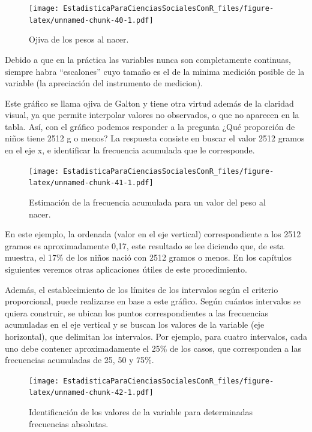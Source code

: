 \documentclass[]{book}
\begin{document}
\begin{figure}
\centering
\texttt{[image: EstadisticaParaCienciasSocialesConR\_files/figure-latex/unnamed-chunk-40-1.pdf]}
\caption{\label{fig:unnamed-chunk-40}Ojiva de los pesos al nacer.}
\end{figure}

Debido a que en la práctica las variables nunca son completamente continuas, siempre habra ``escalones'' cuyo tamaño es el de la minima medición posible de la variable (la apreciación del instrumento de medicion).

Este gráfico se llama ojiva de Galton y tiene otra virtud además de la claridad visual, ya que permite interpolar valores no observados, o que no aparecen en la tabla. Así, con el gráfico podemos responder a la pregunta ¿Qué proporción de niños tiene 2512 g o menos? La respuesta consiste en buscar el valor 2512 gramos en el eje x, e identificar la frecuencia acumulada que le corresponde.

\begin{figure}
\centering
\texttt{[image: EstadisticaParaCienciasSocialesConR\_files/figure-latex/unnamed-chunk-41-1.pdf]}
\caption{\label{fig:unnamed-chunk-41}Estimación de la frecuencia acumulada para un valor del peso al nacer.}
\end{figure}

En este ejemplo, la ordenada (valor en el eje vertical) correspondiente a los 2512 gramos es aproximadamente 0,17, este resultado se lee diciendo que, de esta muestra, el 17\% de los niños nació con 2512 gramos o menos. En los capítulos siguientes veremos otras aplicaciones útiles de este procedimiento.

Además, el establecimiento de los límites de los intervalos según el criterio proporcional, puede realizarse en base a este gráfico. Según cuántos intervalos se quiera construir, se ubican los puntos correspondientes a las frecuencias acumuladas en el eje vertical y se buscan los valores de la variable (eje horizontal), que delimitan los intervalos. Por ejemplo, para cuatro intervalos, cada uno debe contener aproximadamente el 25\% de los casos, que corresponden a las frecuencias acumuladas de 25, 50 y 75\%.

\begin{figure}
\centering
\texttt{[image: EstadisticaParaCienciasSocialesConR\_files/figure-latex/unnamed-chunk-42-1.pdf]}
\caption{\label{fig:unnamed-chunk-42}Identificación de los valores de la variable para determinadas frecuencias absolutas.}
\end{figure}
\end{document}
